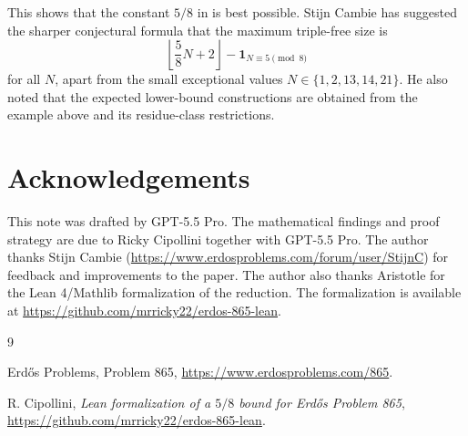 \documentclass[11pt]{amsart}
\theoremstyle{definition}
\begin{document}
This shows that the constant $5/8$ in  is best possible.
Stijn Cambie has suggested the sharper conjectural formula that the maximum triple-free size is
\[
\left\lfloor \frac58N+2\right\rfloor-\mathbf 1_{N\equiv 5\pmod 8}
\]
for all \(N\), apart from the small exceptional values \(N\in\{1,2,13,14,21\}\). He also noted that the expected lower-bound constructions are obtained from the example above and its residue-class restrictions.

\section*{Acknowledgements}
This note was drafted by GPT-5.5 Pro. The mathematical findings and proof strategy are due to Ricky Cipollini together with GPT-5.5 Pro. The author thanks Stijn Cambie (\url{https://www.erdosproblems.com/forum/user/StijnC}) for feedback and improvements to the paper. The author also thanks Aristotle for the Lean 4/Mathlib formalization of the reduction. The formalization is available at \url{https://github.com/mrricky22/erdos-865-lean}.

\begin{thebibliography}{9}

Erd\H{o}s Problems, Problem 865,
\url{https://www.erdosproblems.com/865}.

R. Cipollini,
\emph{Lean formalization of a $5/8$ bound for Erd\H{o}s Problem 865},
\url{https://github.com/mrricky22/erdos-865-lean}.

\end{thebibliography}
\end{document}

